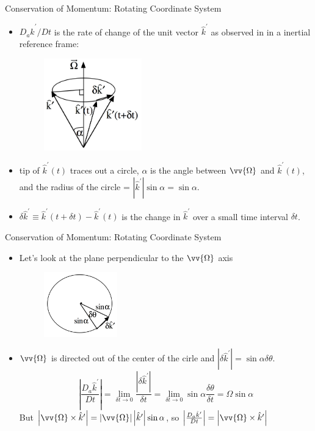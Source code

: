 \begin{frame}{Conservation of Momentum: Rotating Coordinate System}
\begin{itemize}
	\item $D_a \hat k^\prime / Dt$ is the rate of change of the unit vector $\hat k^\prime$ as observed in in a inertial reference frame:
	\begin{figure}
		\includegraphics[width=0.4\textwidth]{rotate1.png}
	\end{figure}
	\item tip of $\hat k^\prime (t)$ traces out a circle, $\alpha$ is the angle between $\vv{\Omega}$ and $\hat k^\prime(t)$, and the radius of the circle = $|\hat k^\prime| \sin \alpha = \sin \alpha$.
	\item $\delta \hat k^\prime \equiv \hat k^\prime(t+\delta t) - \hat k^\prime(t)$ is the change in $\hat k^\prime$ over a small time interval  $\delta t$.
\end{itemize}
\end{frame}
\begin{frame}{Conservation of Momentum: Rotating Coordinate System}
\begin{itemize}
	\item Let's look at the plane perpendicular to the $\vv{\Omega}$ axis
	\begin{figure}
		\includegraphics[width=0.3\textwidth]{rotate2.png}
	\end{figure}
	\item $\vv{\Omega}$ is directed out of the center of the cirle and $|\delta \hat k^\prime| = \sin \alpha \delta \theta$.
	$$\left|\frac{D_a \hat k^\prime}{Dt}\right| = \lim_{\delta t\rightarrow 0} \frac{\left|\delta \hat k^\prime\right|}{\delta t} = \lim_{\delta t\rightarrow 0}\sin \alpha \frac{\delta \theta}{\delta t} = \Omega \sin \alpha$$
	But $\left| \vv{\Omega} \times \hat k^\prime \right| = \left| \vv{\Omega}\right| \left| \hat k^\prime \right| \sin \alpha$, so $\left|\frac{D_a \hat k^\prime}{Dt}\right| = \left| \vv{\Omega} \times \hat k^\prime \right|$
\end{itemize}
\end{frame}
